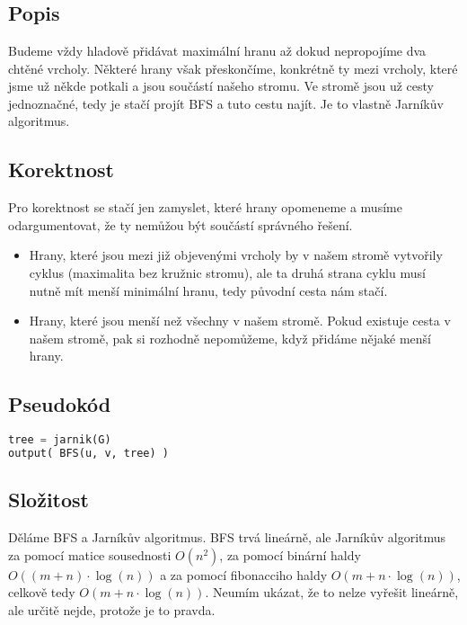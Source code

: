 \documentclass[a4paper]{article}
\begin{document}
\text{}\vspace{-0.1cm}
{\fontsize{12}{15}\selectfont \hspace{-0.5cm}}

\section{}
\subsection{Popis}
Budeme vždy hladově přidávat maximální hranu až dokud nepropojíme dva chtěné vrcholy. Některé hrany však přeskončíme, konkrétně ty mezi vrcholy, které jsme už někde potkali a jsou součástí našeho stromu. Ve stromě jsou už cesty jednoznačné, tedy je stačí projít BFS a tuto cestu najít. Je to vlastně Jarníkův algoritmus.
\subsection{Korektnost}
Pro korektnost se stačí jen zamyslet, které hrany opomeneme a musíme odargumentovat, že ty nemůžou být součástí správného řešení. \begin{itemize}
	\item Hrany, které jsou mezi již objevenými vrcholy by v našem stromě vytvořily cyklus (maximalita bez kružnic stromu), ale ta druhá strana cyklu musí nutně mít menší minimální hranu, tedy původní cesta nám stačí.
	\item Hrany, které jsou menší než všechny v našem stromě. Pokud existuje cesta v našem stromě, pak si rozhodně nepomůžeme, když přidáme nějaké menší hrany.
\end{itemize}
\subsection{Pseudokód}
\begin{lstlisting}[language=Python]
tree = jarnik(G)
output( BFS(u, v, tree) )
\end{lstlisting}
\subsection{Složitost}
Děláme BFS a Jarníkův algoritmus. BFS trvá lineárně, ale Jarníkův algoritmus za pomocí matice sousednosti $O(n^2)$, za pomocí binární haldy $O((m+n)\cdot \log(n))$ a za pomocí fibonacciho haldy $O(m+n\cdot \log(n))$, celkově tedy $O(m+n\cdot \log(n))$. Neumím ukázat, že to nelze vyřešit lineárně, ale určitě nejde, protože je to pravda.
\end{document}
